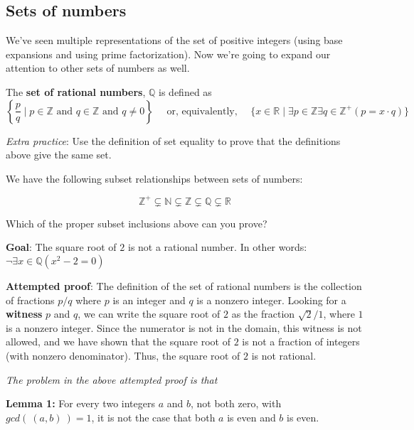 \documentclass[12pt, oneside]{article}
\begin{document}
\newpage
\subsection*{Sets of numbers}

We've seen multiple representations of the set of positive integers
(using base expansions and using prime factorization). Now we're 
going to expand our attention to other sets of numbers as well.


The {\bf set  of rational numbers}, $\mathbb{Q}$  is defined as 
\[
\left\{ \frac{p}{q} \mid p \in \mathbb{Z}  \text{ and  } q  \in \mathbb{Z} \text{ and } q \neq  0 \right\}
\text{~~~~or, equivalently,~~~~}
\{ x  \in  \mathbb{R} \mid \exists p \in \mathbb{Z}  \exists q \in \mathbb{Z}^+ ( p =  x \cdot q) \}
\]

{\it Extra practice}: Use the definition of set equality to prove that the definitions above  give the same set.

 

We have the following subset relationships between sets of numbers:

\[
    \mathbb{Z}^{+} \subsetneq \mathbb{N} \subsetneq \mathbb{Z} \subsetneq \mathbb{Q} \subsetneq \mathbb{R}
\]


Which of the proper subset inclusions above can you prove?

\vspace{100pt} 

{\bf Goal}:  The square root of $2$ is not a rational number.  In other words: $\neg \exists x \in \mathbb{Q} ( x^2 -  2 = 0)$

{\bf Attempted proof}: The definition of the set of rational numbers is the collection of fractions $p/q$ where $p$ is an integer and $q$ is a nonzero integer. Looking for a {\bf witness} $p$ and $q$, we can write the square root of $2$ as the fraction 
$\sqrt{2 }/1$, where $1$ is a nonzero integer. Since the numerator is not in the domain, this witness is not allowed, and we have shown that the square root of $2$ is not a fraction of integers (with nonzero denominator). Thus, the square root of $2$ is not rational.


{\it The problem in the above attempted proof is that} \underline{\phantom{it only considers one candidate witness
and does not prove that no witnesses exist.}}


{\bf Lemma 1:} For every two integers $a$ and  $b$, not both zero, with  $gcd(~(a,b)~) = 1$, it is not the case that both $a$
is  even and $b$ is even.
\end{document}
